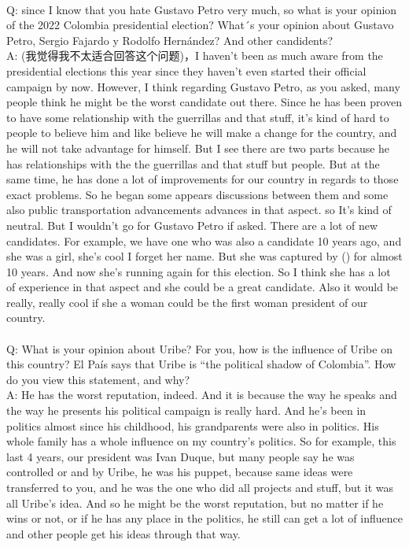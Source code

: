 \documentclass{phyasgn}\usepackage{nag}
\begin{document}
\\
Q: since I know that you hate Gustavo Petro very much, so what is your opinion of the 2022 Colombia presidential election? What´s your opinion about Gustavo Petro, Sergio Fajardo y Rodolfo Hernández? And other candidents?\\
A: (我觉得我不太适合回答这个问题)，I haven't been as much aware from the presidential elections this year since they haven't even started their official campaign by now. However, I think regarding Gustavo Petro, as you asked, many people think he might be the worst candidate out there. Since he has been proven to have some relationship with the guerrillas and that stuff, it's kind of hard to people to believe him and like believe he will make a change for the country, and he will not take advantage for himself. But I see there are two parts because he has relationships with the the guerrillas and that stuff but people. But at the same time, he has done a lot of improvements for our country in regards to those exact problems. So he began some appears discussions between them and some also public transportation advancements advances in that aspect. so It's kind of neutral. But I wouldn't go for Gustavo Petro if asked. There are a lot of new candidates. For example, we have one who was also a candidate 10 years ago, and she was a girl, she's cool I forget her name. But she was captured by () for almost 10 years. And now she's running again for this election. So I think she has a lot of experience in that aspect and she could be a great candidate. Also it would be really, really cool if she a woman could be the first woman president of our country.\\
\\
Q: What is your opinion about Uribe? For you, how is the influence of Uribe on this country? El País says that Uribe is “the political shadow of Colombia”. How do you view this statement, and why?\\
A: He has the worst reputation, indeed. And it is because the way he speaks and the way he presents his political campaign is really hard. And he's been in politics almost since his childhood, his grandparents were also in politics. His whole family has a whole influence on my country's politics. So for example, this last 4 years, our president was Ivan Duque, but many people say he was controlled or and by Uribe, he was his puppet, because same ideas were transferred to you, and he was the one who did all projects and stuff, but it was all Uribe’s idea. And so he might be the worst reputation, but no matter if he wins or not, or if he has any place in the politics, he still can get a lot of influence and other people get his ideas through that way.\\
\end{document}
